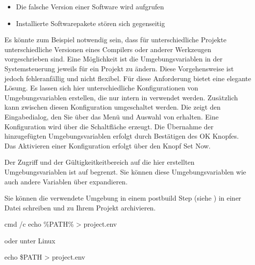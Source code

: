 \begin{itemize}
\item Die falsche Version einer Software wird aufgrufen
\item Installierte Softwarepakete stören sich gegenseitig
\end{itemize}

Es könnte zum Beispiel notwendig sein, dass für unterschiedliche Projekte unterschiedliche Versionen eines Compilers oder anderer Werkzeugen vorgeschrieben sind. Eine Möglichkeit ist die Umgebungsvariablen in der Systemsteuerung jeweils für ein Projekt zu ändern. Diese Vorgehensweise ist jedoch fehleranfällig und nicht flexibel. Für diese Anforderung bietet \codeblocks eine elegante Lösung. Es lassen sich hier unterschiedliche Konfigurationen von Umgebungsvariablen erstellen, die nur intern in \codeblocks verwendet werden. Zusätzlich kann zwischen diesen Konfiguration umgeschaltet werden. Die  zeigt den Eingabedialog, den Sie über das Menü  und Auswahl von  erhalten. Eine Konfiguration wird über die Schaltfläche  erzeugt. Die Übernahme der hinzugefügten Umgebungsvariablen erfolgt durch Bestätigen des OK Knopfes. Das Aktivieren einer Konfiguration erfolgt über den Knopf Set Now.


Der Zugriff und der Gültigkeitkeitbereich auf die hier erstellten Umgebungsvariablen ist auf \codeblocks begrenzt. Sie können diese Umgebungsvariablen wie auch andere \codeblocks Variablen über  expandieren.



Sie können die verwendete Umgebung in einem postbuild Step (siehe ) in einer Datei  schreiben und zu Ihrem Projekt archivieren.

\begin{cmd}
cmd /c echo \%PATH\%  > project.env
\end{cmd}

oder unter Linux

\begin{cmd}
echo \$PATH > project.env
\end{cmd}

